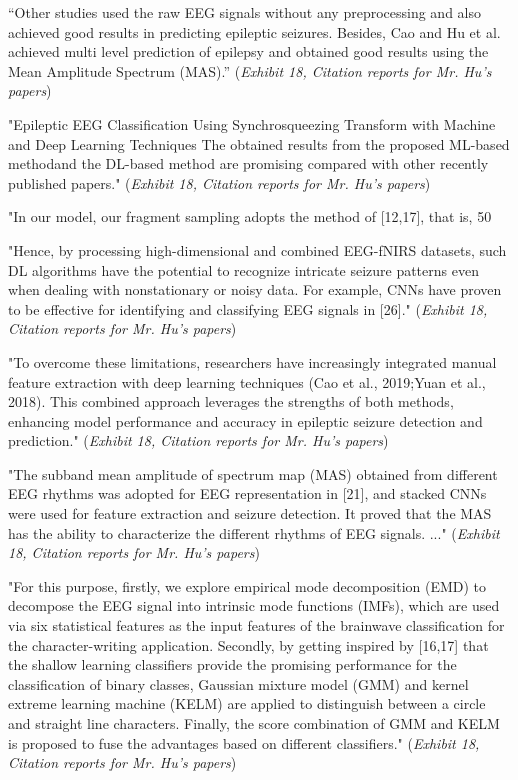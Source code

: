 \documentclass{article}
\begin{document}
“Other studies  used the raw EEG signals without any preprocessing and also achieved good results in predicting epileptic seizures. Besides, Cao and Hu et al. achieved multi level prediction of epilepsy and obtained good results using the Mean Amplitude Spectrum (MAS).” ({\it Exhibit 18, Citation reports for Mr. Hu’s papers})

"Epileptic EEG Classification Using Synchrosqueezing Transform with Machine and Deep Learning Techniques
The obtained results from the proposed ML-based methodand the DL-based method are promising compared with other recently published papers."  ({\it Exhibit 18, Citation reports for Mr. Hu’s papers})

"In our model, our fragment sampling adopts the method of [12,17], that is, 50%

"Hence, by processing high-dimensional and combined EEG-fNIRS datasets, such DL algorithms have the potential to recognize intricate seizure patterns even when dealing with nonstationary or noisy data. For example, CNNs have proven to be effective for identifying and classifying EEG signals in [26]." ({\it Exhibit 18, Citation reports for Mr. Hu’s papers})

"To overcome these limitations, researchers have increasingly integrated manual feature extraction with deep learning techniques (Cao et al., 2019;Yuan et al., 2018). This combined approach leverages the strengths of both methods, enhancing model performance and accuracy in epileptic seizure detection and prediction." ({\it Exhibit 18, Citation reports for Mr. Hu’s papers})

"The subband mean amplitude of spectrum map (MAS) obtained from different EEG rhythms was adopted for EEG representation in [21], and stacked CNNs were used for feature extraction and seizure detection. It proved that the MAS has the ability to characterize the different rhythms of EEG signals. ..." ({\it Exhibit 18, Citation reports for Mr. Hu’s papers})

"For this purpose, firstly, we explore empirical mode decomposition (EMD) to decompose the EEG signal into intrinsic mode functions (IMFs), which are used via six statistical features as the input features of the brainwave classification for the character-writing application. Secondly, by getting inspired by [16,17] that the shallow learning classifiers provide the promising performance for the classification of binary classes, Gaussian mixture model (GMM) and kernel extreme learning machine (KELM) are applied to distinguish between a circle and straight line characters. Finally, the score combination of GMM and KELM is proposed to fuse the advantages based on different classifiers." ({\it Exhibit 18, Citation reports for Mr. Hu’s papers})
\end{document}

